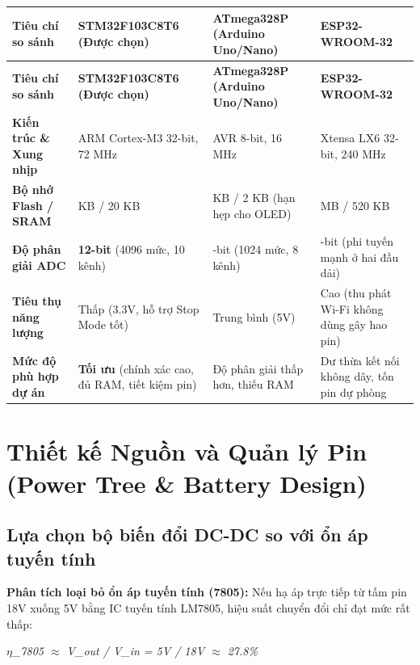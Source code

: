 \documentclass[12pt,a4paper]{report}
\begin{document}
{
\small
\setlength{\LTleft}{0pt}\setlength{\LTright}{0pt}
\begin{longtable}{>{\raggedright\arraybackslash}p{}>{\raggedright\arraybackslash}p{}>{\raggedright\arraybackslash}p{}>{\raggedright\arraybackslash}p{}}
\toprule
\textbf{Tiêu chí so sánh} & \textbf{STM32F103C8T6 (Được chọn)} & \textbf{ATmega328P (Arduino Uno/Nano)} & \textbf{ESP32-WROOM-32} \\
\midrule
\endfirsthead
\toprule
\textbf{Tiêu chí so sánh} & \textbf{STM32F103C8T6 (Được chọn)} & \textbf{ATmega328P (Arduino Uno/Nano)} & \textbf{ESP32-WROOM-32} \\
\midrule
\endhead
\bottomrule
\endfoot
\bottomrule
\endlastfoot
\textbf{Kiến trúc \& Xung nhịp} & ARM Cortex-M3 32-bit, 72 MHz & AVR 8-bit, 16 MHz & Xtensa LX6 32-bit, 240 MHz \\
\textbf{Bộ nhớ Flash / SRAM} & 64 KB / 20 KB & 32 KB / 2 KB (hạn hẹp cho OLED) & 4 MB / 520 KB \\
\textbf{Độ phân giải ADC} & \textbf{12-bit} (4096 mức, 10 kênh) & 10-bit (1024 mức, 8 kênh) & 12-bit (phi tuyến mạnh ở hai đầu dải) \\
\textbf{Tiêu thụ năng lượng} & Thấp (3.3V, hỗ trợ Stop Mode tốt) & Trung bình (5V) & Cao (thu phát Wi-Fi không dùng gây hao pin) \\
\textbf{Mức độ phù hợp dự án} & \textbf{Tối ưu} (chính xác cao, đủ RAM, tiết kiệm pin) & Độ phân giải thấp hơn, thiếu RAM & Dư thừa kết nối không dây, tốn pin dự phòng \\
\end{longtable}
}

\section{Thiết kế Nguồn và Quản lý Pin (Power Tree \& Battery Design)}

\subsection{Lựa chọn bộ biến đổi DC-DC so với ổn áp tuyến tính}

\textbf{Phân tích loại bỏ ổn áp tuyến tính (7805):} Nếu hạ áp trực tiếp từ tấm pin 18V xuống 5V bằng IC tuyến tính LM7805, hiệu suất chuyển đổi chỉ đạt mức rất thấp:

\textit{\ensuremath{\eta}\_7805 \ensuremath{\approx} V\_out / V\_in = 5V / 18V \ensuremath{\approx} 27.8\%   }
\end{document}
